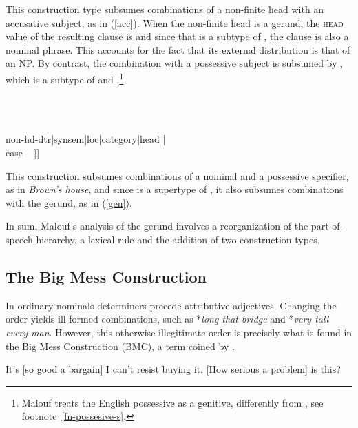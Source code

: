 \documentclass[output=paper
	        ,collection
	        ,collectionchapter
 	        ,biblatex
                ,babelshorthands
                ,newtxmath
                ,draftmode
                ,colorlinks, citecolor=brown
]{langscibook}
\begin{document}
\noindent
This construction type subsumes combinations of a non-finite head with 
an accusative subject, as in (\ref{acc}). When the non-finite head is a gerund, 
the \textsc{head} value of the resulting clause is  
and since that is a subtype of , the clause is also a nominal phrase. 
This accounts for the fact that its external distribution is that of an NP.  
By contrast, the combination with a possessive subject is subsumed by 
, which is a subtype of  and 
 \citep[16]{Malouf00}.\footnote{Malouf treats 
the English possessive as a genitive, differently from \citet[]{SagWasow03}, see
footnote~\ref{fn-possesive-s}.}

\begin{exe} 
\ex\label{gencx} 
 ~ \impl ~ 
\begin{avm} 
[synsem|loc [category|head ~ \type{noun}                \\
             content ~ \type{scope-object}]             \\
 non-hd-dtr|synsem|loc|category|head [       \\
                                      case ~ ]] 
\end{avm}
\end{exe}
 
\noindent
This construction subsumes combinations of a nominal and a 
possessive specifier, as in \emph{Brown's house}, and since 
 is a supertype of ,  
it also subsumes combinations with the gerund, as in (\ref{gen}). 

In sum, Malouf's analysis of the gerund involves a reorganization of the 
part-of-speech hierarchy, a lexical rule and the addition of two construction types.     



\subsection{The Big Mess Construction} 
\label{bime}  


In ordinary nominals determiners precede attributive adjectives. Changing the order 
yields ill-formed combinations, such as *\emph{long that bridge} and *\emph{very tall every man}. 
However, this otherwise illegitimate order is precisely what is found in 
the Big Mess Construction (BMC), a term coined by \citet{Berman74}.  

\begin{exe}
\ex\label{bigme}
\begin{xlist}
\ex   It's [so good a bargain] I can't resist buying it.
\ex   {}[How serious a problem] is this?
\end{xlist}
\end{exe} 
\end{document}
